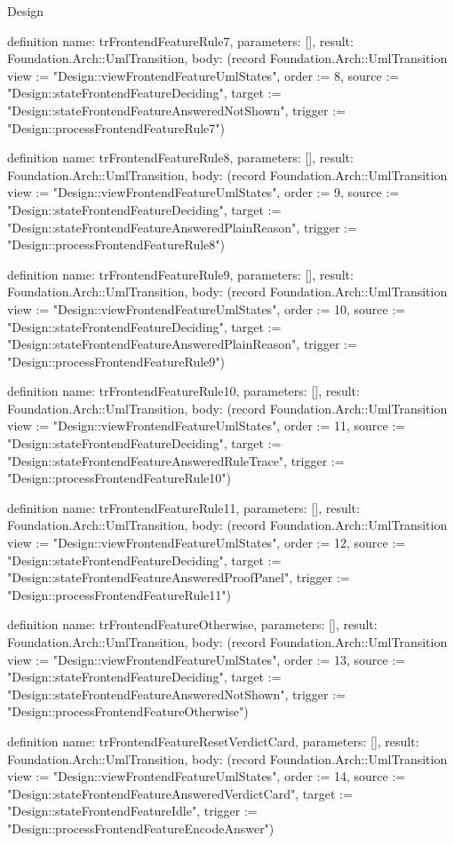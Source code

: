 \begin{lexlean}{Design}
\begin{semanticmodule}
definition{
  name: trFrontendFeatureRule7,
  parameters: [],
  result: Foundation.Arch::UmlTransition,
  body: (record Foundation.Arch::UmlTransition {view := "Design::viewFrontendFeatureUmlStates", order := 8, source := "Design::stateFrontendFeatureDeciding", target := "Design::stateFrontendFeatureAnsweredNotShown", trigger := "Design::processFrontendFeatureRule7"})
}

definition{
  name: trFrontendFeatureRule8,
  parameters: [],
  result: Foundation.Arch::UmlTransition,
  body: (record Foundation.Arch::UmlTransition {view := "Design::viewFrontendFeatureUmlStates", order := 9, source := "Design::stateFrontendFeatureDeciding", target := "Design::stateFrontendFeatureAnsweredPlainReason", trigger := "Design::processFrontendFeatureRule8"})
}

definition{
  name: trFrontendFeatureRule9,
  parameters: [],
  result: Foundation.Arch::UmlTransition,
  body: (record Foundation.Arch::UmlTransition {view := "Design::viewFrontendFeatureUmlStates", order := 10, source := "Design::stateFrontendFeatureDeciding", target := "Design::stateFrontendFeatureAnsweredPlainReason", trigger := "Design::processFrontendFeatureRule9"})
}

definition{
  name: trFrontendFeatureRule10,
  parameters: [],
  result: Foundation.Arch::UmlTransition,
  body: (record Foundation.Arch::UmlTransition {view := "Design::viewFrontendFeatureUmlStates", order := 11, source := "Design::stateFrontendFeatureDeciding", target := "Design::stateFrontendFeatureAnsweredRuleTrace", trigger := "Design::processFrontendFeatureRule10"})
}

definition{
  name: trFrontendFeatureRule11,
  parameters: [],
  result: Foundation.Arch::UmlTransition,
  body: (record Foundation.Arch::UmlTransition {view := "Design::viewFrontendFeatureUmlStates", order := 12, source := "Design::stateFrontendFeatureDeciding", target := "Design::stateFrontendFeatureAnsweredProofPanel", trigger := "Design::processFrontendFeatureRule11"})
}

definition{
  name: trFrontendFeatureOtherwise,
  parameters: [],
  result: Foundation.Arch::UmlTransition,
  body: (record Foundation.Arch::UmlTransition {view := "Design::viewFrontendFeatureUmlStates", order := 13, source := "Design::stateFrontendFeatureDeciding", target := "Design::stateFrontendFeatureAnsweredNotShown", trigger := "Design::processFrontendFeatureOtherwise"})
}

definition{
  name: trFrontendFeatureResetVerdictCard,
  parameters: [],
  result: Foundation.Arch::UmlTransition,
  body: (record Foundation.Arch::UmlTransition {view := "Design::viewFrontendFeatureUmlStates", order := 14, source := "Design::stateFrontendFeatureAnsweredVerdictCard", target := "Design::stateFrontendFeatureIdle", trigger := "Design::processFrontendFeatureEncodeAnswer"})
}


\end{semanticmodule}
\end{lexlean}

